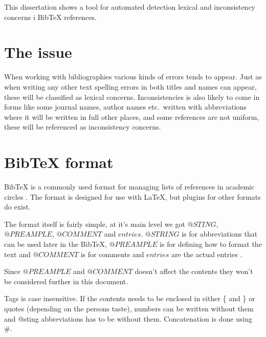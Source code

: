 
This dissertation shows a tool for automated detection lexical
and inconsistency concerns i Bib{\TeX} references.


\section{The issue}

When working with bibliographies various kinds of errors tends to
appear.  Just as when writing any other text spelling errors in both
titles and names can appear, these will be classified as lexical
concerns.  Inconsistencies is also likely to come in forms like some
journal names, author names etc.\ written with abbreviations where it
will be written in full other places, and some references are not
uniform, these will be referenced as inconsistency concerns.


\section{Bib{\TeX} format}
Bib{\TeX} is a commonly used format for managing lists of references in
academic circles .  The format is
designed for use with {\LaTeX}, but plugins for other formats do
exist. \autocite{bibtex_resource}

The format itself is fairly simple, at it's main level we got
$@STING$, $@PREAMPLE$, $@COMMENT$ and $entries$.  $@STRING$ is for
abbreviations that can be used later in the Bib{\TeX}, $@PREAMPLE$ is for
defining how to format the text and $@COMMENT$ is for comments and
$entries$ are the actual entries \autocite{bibtex_resource}.

Since $@PREAMPLE$ and $@COMMENT$ doesn't affect the contents they
won't be considered further in this document. 

Tags is case insensitive. If the contents needs to be enclosed in
either \{ and \} or quotes (depending on the persons taste), numbers
can be written without them and @sting abbreviations has to be without
them. Concatenation is done using \#.\autocite{bibtex_resource}


